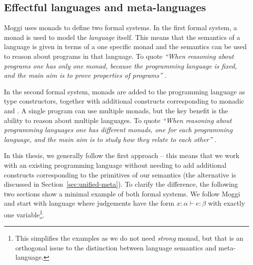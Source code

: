 
\subsection{Effectful languages and meta-languages}
\label{sec:path-sem-langs}

Moggi uses monads to define two formal systems. In the first formal system, a monad is used to model 
the \emph{language} itself. This means that the semantics of a language is given in terms of a 
one specific monad and the semantics can be used to reason about programs in that language. To quote 
\emph{``When reasoning about programs one has only one monad, because the programming language is 
fixed, and the main aim is to prove properties of programs''} \cite[p. 5]{monad-notions}.

In the second formal system, monads are added to the programming language as type constructors, 
together with additional constructs corresponding to monadic  and .
A single program can use multiple monads, but the key benefit is the ability to reason
about multiple languages. To quote \emph{``When reasoning about programming languages one has different 
monads, one for each programming language, and the main aim is to study how they relate to each 
other''} \cite[p. 5]{monad-notions}.

In this thesis, we generally follow the first approach -- this means that we work with an existing
programming language without needing to add additional constructs corresponding to the primitives
of our semantics (the alternative is discussed in Section~\ref{sec:unified-meta}). To clarify the 
difference, the following two sections show a minimal example of both formal systems. We follow 
Moggi and start with language where judgements have the form $x\!:\!\alpha \vdash e : \beta$ with 
exactly one variable\footnote{This simplifies the examples as we do not need \emph{strong} monad, 
but that is an orthogonal issue to the distinction between language semantics and meta-language.}.


